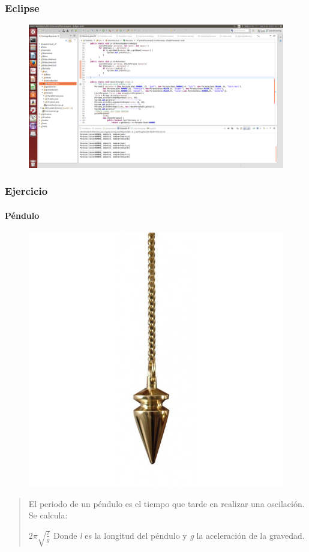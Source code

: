 \documentclass{beamer}
\begin{document}
\begin{frame}
\frametitle{Eclipse} 
\begin{figure}
\includegraphics[scale=0.16]{imagenes/eclipse1.png} 
\end{figure} 
\end{frame}

\begin{frame}[fragile]
\frametitle{Ejercicio}
\framesubtitle{Péndulo}
\begin{figure}
\includegraphics[scale=0.2]{imagenes/pendulo.jpg} 
\end{figure}
\begin{verse}
El periodo de un péndulo es el tiempo que tarde en realizar una oscilación. Se calcula:\\
\begin{center}
$2\pi\sqrt{\frac{l}{g}}$
Donde \emph{l} es la longitud del péndulo y \emph{g} la aceleración de la gravedad.
\end{center}\end{verse}
\end{frame}
\end{document}
